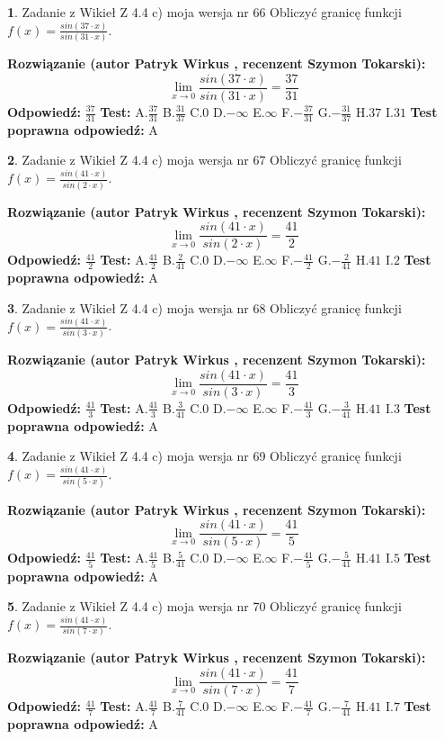 \documentclass[12pt, a4paper]{article}
\theoremstyle{definition} %
\newtheorem{zad}{}
\newcommand{\zadStart}[1]{\begin{zad}#1\newline}
\newcommand{\zadStop}{\end{zad}}
\newcommand{\rozwStart}[2]{\noindent \textbf{Rozwiązanie (autor #1 , recenzent #2): }\newline}
\newcommand{\rozwStop}{\newline}
\newcommand{\odpStart}{\noindent \textbf{Odpowiedź:}\newline}
\newcommand{\odpStop}{\newline}
\newcommand{\testStart}{\noindent \textbf{Test:}\newline}
\newcommand{\testStop}{\newline}
\newcommand{\kluczStart}{\noindent \textbf{Test poprawna odpowiedź:}\newline}
\newcommand{\kluczStop}{\newline}
\begin{document}
\zadStart{Zadanie z Wikieł Z 4.4 c) moja wersja nr 66}
Obliczyć granicę funkcji $f(x)=\frac{sin(37\cdot x)}{sin(31\cdot x)}$.
\zadStop
\rozwStart{Patryk Wirkus}{Szymon Tokarski}
$$\lim\limits_{x\to 0}\frac{sin(37\cdot x)}{sin(31\cdot x)}=
\frac{37}{31}$$
\rozwStop
\odpStart
$\frac{37}{31}$
\odpStop
\testStart
A.$\frac{37}{31}$
B.$\frac{31}{37}$
C.$0$
D.$-\infty$
E.$\infty$
F.$-\frac{37}{31}$
G.$-\frac{31}{37}$
H.$37$
I.$31$
\testStop
\kluczStart
A
\kluczStop



\zadStart{Zadanie z Wikieł Z 4.4 c) moja wersja nr 67}
Obliczyć granicę funkcji $f(x)=\frac{sin(41\cdot x)}{sin(2\cdot x)}$.
\zadStop
\rozwStart{Patryk Wirkus}{Szymon Tokarski}
$$\lim\limits_{x\to 0}\frac{sin(41\cdot x)}{sin(2\cdot x)}=
\frac{41}{2}$$
\rozwStop
\odpStart
$\frac{41}{2}$
\odpStop
\testStart
A.$\frac{41}{2}$
B.$\frac{2}{41}$
C.$0$
D.$-\infty$
E.$\infty$
F.$-\frac{41}{2}$
G.$-\frac{2}{41}$
H.$41$
I.$2$
\testStop
\kluczStart
A
\kluczStop



\zadStart{Zadanie z Wikieł Z 4.4 c) moja wersja nr 68}
Obliczyć granicę funkcji $f(x)=\frac{sin(41\cdot x)}{sin(3\cdot x)}$.
\zadStop
\rozwStart{Patryk Wirkus}{Szymon Tokarski}
$$\lim\limits_{x\to 0}\frac{sin(41\cdot x)}{sin(3\cdot x)}=
\frac{41}{3}$$
\rozwStop
\odpStart
$\frac{41}{3}$
\odpStop
\testStart
A.$\frac{41}{3}$
B.$\frac{3}{41}$
C.$0$
D.$-\infty$
E.$\infty$
F.$-\frac{41}{3}$
G.$-\frac{3}{41}$
H.$41$
I.$3$
\testStop
\kluczStart
A
\kluczStop



\zadStart{Zadanie z Wikieł Z 4.4 c) moja wersja nr 69}
Obliczyć granicę funkcji $f(x)=\frac{sin(41\cdot x)}{sin(5\cdot x)}$.
\zadStop
\rozwStart{Patryk Wirkus}{Szymon Tokarski}
$$\lim\limits_{x\to 0}\frac{sin(41\cdot x)}{sin(5\cdot x)}=
\frac{41}{5}$$
\rozwStop
\odpStart
$\frac{41}{5}$
\odpStop
\testStart
A.$\frac{41}{5}$
B.$\frac{5}{41}$
C.$0$
D.$-\infty$
E.$\infty$
F.$-\frac{41}{5}$
G.$-\frac{5}{41}$
H.$41$
I.$5$
\testStop
\kluczStart
A
\kluczStop



\zadStart{Zadanie z Wikieł Z 4.4 c) moja wersja nr 70}
Obliczyć granicę funkcji $f(x)=\frac{sin(41\cdot x)}{sin(7\cdot x)}$.
\zadStop
\rozwStart{Patryk Wirkus}{Szymon Tokarski}
$$\lim\limits_{x\to 0}\frac{sin(41\cdot x)}{sin(7\cdot x)}=
\frac{41}{7}$$
\rozwStop
\odpStart
$\frac{41}{7}$
\odpStop
\testStart
A.$\frac{41}{7}$
B.$\frac{7}{41}$
C.$0$
D.$-\infty$
E.$\infty$
F.$-\frac{41}{7}$
G.$-\frac{7}{41}$
H.$41$
I.$7$
\testStop
\kluczStart
A
\kluczStop
\end{document}
